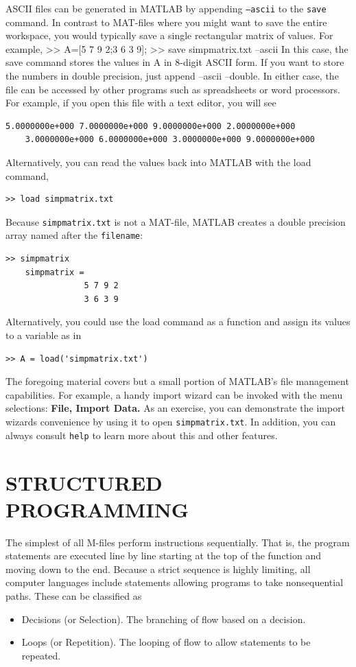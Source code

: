 \documentclass[../main.tex]{subfiles}
\begin{document}
ASCII files can be generated in MATLAB by appending \texttt{–ascii} to the \texttt{save} command. In contrast to MAT-files where you might want to save the entire workspace, you
would typically save a single rectangular matrix of values. For example,
>> A=[5 7 9 2;3 6 3 9];
>> save simpmatrix.txt –ascii
In this case, the save command stores the values in A in 8-digit ASCII form. If you want
to store the numbers in double precision, just append –ascii –double. In either case, the
file can be accessed by other programs such as spreadsheets or word processors. For
example, if you open this file with a text editor, you will see
\begin{lstlisting}[frame=none, numbers=none]
    5.0000000e+000 7.0000000e+000 9.0000000e+000 2.0000000e+000
    3.0000000e+000 6.0000000e+000 3.0000000e+000 9.0000000e+000
\end{lstlisting}

Alternatively, you can read the values back into MATLAB with the load command,
\begin{lstlisting}[frame=none, numbers=none]
    >> load simpmatrix.txt
\end{lstlisting}
Because \texttt{simpmatrix.txt} is not a MAT-file, MATLAB creates a double precision array
named after the \texttt{filename}:
\begin{lstlisting}[frame=none, numbers=none]
    >> simpmatrix
    simpmatrix =
                5 7 9 2
                3 6 3 9
\end{lstlisting}

Alternatively, you could use the load command as a function and assign its values to a
variable as in
\begin{lstlisting}[frame=none, numbers=none]
    >> A = load('simpmatrix.txt')
\end{lstlisting}

The foregoing material covers but a small portion of MATLAB's file management capabilities. For example, a handy import wizard can be invoked with the menu selections:
\textbf{File, Import Data.} As an exercise, you can demonstrate the import wizards convenience by
using it to open \texttt{simpmatrix.txt}. In addition, you can always consult \texttt{help} to learn more
about this and other features.


\section{STRUCTURED PROGRAMMING}
The simplest of all M-files perform instructions sequentially. That is, the program statements are executed line by line starting at the top of the function and moving down to the
end. Because a strict sequence is highly limiting, all computer languages include statements allowing programs to take nonsequential paths. These can be classified as
\begin{itemize}
    

    \item  Decisions (or Selection). The branching of flow based on a decision.
    \item  Loops (or Repetition). The looping of flow to allow statements to be repeated.
    
\end{itemize}
\end{document}
